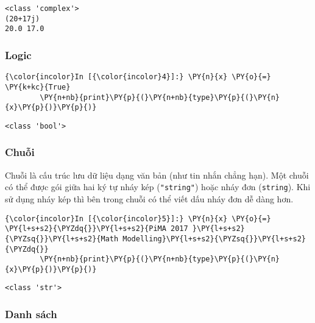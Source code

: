    \begin{Verbatim}[commandchars=\\\{\}]
<class 'complex'>
(20+17j)
20.0 17.0

    \end{Verbatim}

    \subsubsection{Logic}\label{logic}

    
\begin{Verbatim}[commandchars=\\\{\}]
{\color{incolor}In [{\color{incolor}4}]:} \PY{n}{x} \PY{o}{=} \PY{k+kc}{True}
        \PY{n+nb}{print}\PY{p}{(}\PY{n+nb}{type}\PY{p}{(}\PY{n}{x}\PY{p}{)}\PY{p}{)}
\end{Verbatim}
    

    \begin{Verbatim}[commandchars=\\\{\}]
<class 'bool'>

    \end{Verbatim}

    \subsubsection{Chuỗi}\label{chuux1ed7i}

    Chuỗi là cấu trúc lưu dữ liệu dạng văn bản (như tin nhắn chẳng hạn). Một
chuỗi có thể được gói giữa hai ký tự nháy kép (\texttt{"string"}) hoặc
nháy đơn (\texttt{\textquotesingle{}string\textquotesingle{}}). Khi sử
dụng nháy kép thì bên trong chuỗi có thể viết dấu nháy đơn dễ dàng hơn.

    
\begin{Verbatim}[commandchars=\\\{\}]
{\color{incolor}In [{\color{incolor}5}]:} \PY{n}{x} \PY{o}{=} \PY{l+s+s2}{\PYZdq{}}\PY{l+s+s2}{PiMA 2017 }\PY{l+s+s2}{\PYZsq{}}\PY{l+s+s2}{Math Modelling}\PY{l+s+s2}{\PYZsq{}}\PY{l+s+s2}{\PYZdq{}}
        \PY{n+nb}{print}\PY{p}{(}\PY{n+nb}{type}\PY{p}{(}\PY{n}{x}\PY{p}{)}\PY{p}{)}
\end{Verbatim}
    

    \begin{Verbatim}[commandchars=\\\{\}]
<class 'str'>

    \end{Verbatim}

    \subsubsection{Danh sách}\label{danh-suxe1ch}

